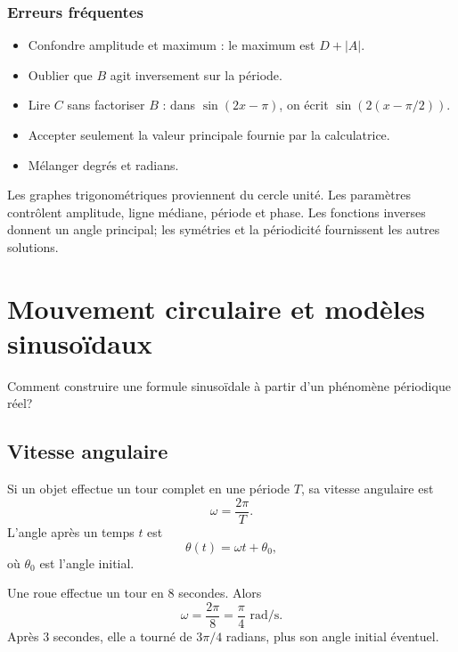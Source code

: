 \documentclass[12pt,a4paper,openany]{book}
\newcommand{\abs}[1]{\left\lvert #1\right\rvert}
\begin{document}
\subsection{Erreurs fréquentes}

\begin{itemize}
\item Confondre amplitude et maximum : le maximum est $D+\abs A$.
\item Oublier que $B$ agit inversement sur la période.
\item Lire $C$ sans factoriser $B$ : dans $\sin(2x-\pi)$, on écrit $\sin(2(x-\pi/2))$.
\item Accepter seulement la valeur principale fournie par la calculatrice.
\item Mélanger degrés et radians.
\end{itemize}

\begin{summarybox}
Les graphes trigonométriques proviennent du cercle unité. Les paramètres contrôlent amplitude, ligne médiane, période et phase. Les fonctions inverses donnent un angle principal; les symétries et la périodicité fournissent les autres solutions.
\end{summarybox}


\chapter{Mouvement circulaire et modèles sinusoïdaux}

\begin{questionbox}
Comment construire une formule sinusoïdale à partir d'un phénomène périodique réel?
\end{questionbox}

\section{Vitesse angulaire}

Si un objet effectue un tour complet en une période $T$, sa vitesse angulaire est
\[
\omega=\frac{2\pi}{T}.
\]
L'angle après un temps $t$ est
\[
\theta(t)=\omega t+\theta_0,
\]
où $\theta_0$ est l'angle initial.

\begin{examplebox}
Une roue effectue un tour en $8$ secondes. Alors
\[
\omega=\frac{2\pi}{8}=\frac\pi4\text{ rad/s}.
\]
Après $3$ secondes, elle a tourné de $3\pi/4$ radians, plus son angle initial éventuel.
\end{examplebox}
\end{document}
